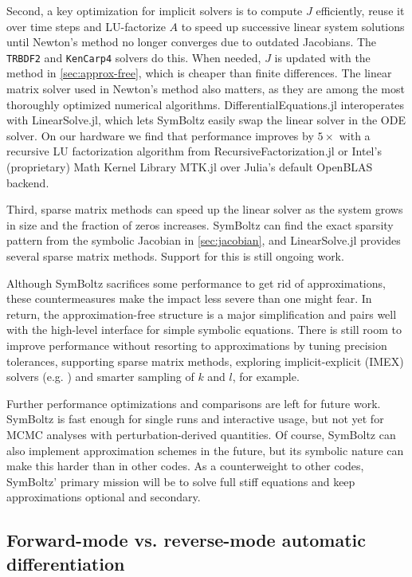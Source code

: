 \documentclass{aa}
\begin{document}
Second, a key optimization for implicit solvers is to compute $J$ efficiently, reuse it over time steps and LU-factorize $A$ to speed up successive linear system solutions until Newton's method no longer converges due to outdated Jacobians.
The \texttt{TRBDF2} and \texttt{KenCarp4} solvers do this.
When needed, $J$ is updated with the method in \cref{sec:approx-free}, which is cheaper than finite differences.
The linear matrix solver used in Newton's method also matters, as they are among the most thoroughly optimized numerical algorithms.
DifferentialEquations.jl interoperates with LinearSolve.jl, which lets SymBoltz easily swap the linear solver in the ODE solver.
On our hardware we find that performance improves by $5\times$ with a recursive LU factorization algorithm from RecursiveFactorization.jl or Intel's (proprietary) Math Kernel Library MTK.jl over Julia's default OpenBLAS backend.

Third, sparse matrix methods can speed up the linear solver as the system grows in size and the fraction of zeros increases.
SymBoltz can find the exact sparsity pattern from the symbolic Jacobian in \cref{sec:jacobian}, and LinearSolve.jl provides several sparse matrix methods.
Support for this is still ongoing work.

Although SymBoltz sacrifices some performance to get rid of approximations, these countermeasures make the impact less severe than one might fear.
In return, the approximation-free structure is a major simplification and pairs well with the high-level interface for simple symbolic equations.
There is still room to improve performance without resorting to approximations by tuning precision tolerances, supporting sparse matrix methods, exploring implicit-explicit (IMEX) solvers (e.g. \cite{kennedyAdditiveRungeKutta2003}) and smarter sampling of $k$ and $l$, for example.

Further performance optimizations and comparisons are left for future work.
SymBoltz is fast enough for single runs and interactive usage, but not yet for MCMC analyses with perturbation-derived quantities.
Of course, SymBoltz can also implement approximation schemes in the future, but its symbolic nature can make this harder than in other codes.
As a counterweight to other codes, SymBoltz' primary mission will be to solve full stiff equations and keep approximations optional and secondary.

\subsection{Forward-mode vs. reverse-mode automatic differentiation}
\label{sec:forwardreverse}
\end{document}
